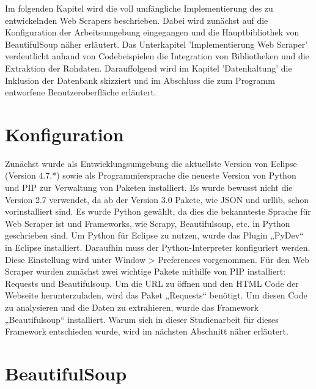 \documentclass[a4paper,oneside,12pt]{report}
\begin{document}
		Im folgenden Kapitel wird die voll umfängliche Implementierung des zu entwickelnden Web Scrapers beschrieben. Dabei wird zunächst auf die Konfiguration der Arbeitsumgebung eingegangen und die Hauptbibliothek von BeautifulSoup näher erläutert. Das Unterkapitel 'Implementierung Web Scraper' verdeutlicht anhand von Codebeispielen die Integration von Bibliotheken und die Extraktion der Rohdaten. Darauffolgend wird im Kapitel 'Datenhaltung' die Inklusion der Datenbank skizziert und im Abschluss die zum Programm entworfene Benutzeroberfläche erläutert.
	
		\section[Konfiguration - Johanna Sickendiek]{Konfiguration}
		
			Zunächst wurde als Entwicklungsumgebung die aktuellste Version von Eclipse (Version 4.7.*) sowie als Programmiersprache die neueste Version von Python und PIP zur Verwaltung von Paketen installiert. Es wurde bewusst nicht die Version 2.7 verwendet, da ab der Version 3.0 Pakete, wie JSON und urllib, schon vorinstalliert sind. Es wurde Python gewählt, da dies die bekannteste Sprache für Web Scraper ist und Frameworks, wie Scrapy, Beautifulsoup, etc. in Python geschrieben sind. 
			\newline
			Um Python für Eclipse zu nutzen, wurde das Plugin „PyDev“ in Eclipse installiert. Daraufhin muss der Python-Interpreter konfiguriert werden. Diese Einstellung wird unter Window > Preferences vorgenommen. \cite{bib-pipEnv}
			\newline
			Für den Web Scraper wurden zunächst zwei wichtige Pakete mithilfe von PIP installiert: Requests und Beautifulsoup.
			Um die URL zu öffnen und den HTML Code der Webseite herunterzuladen, wird das Paket „Requests“ benötigt. Um diesen Code zu analysieren und die Daten zu extrahieren, wurde das Framework „Beautifulsoup“ installiert. \cite{bib-scrapeHero} 
			Warum sich in dieser Studienarbeit für dieses Framework entschieden wurde, wird im nächsten Abschnitt näher erläutert. 

	
		\section[BeautifulSoup - Anja Wolf]{BeautifulSoup}
		
\end{document}
